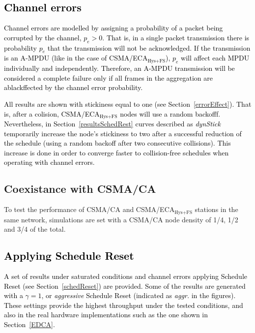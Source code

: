 	\textcolor{black}{\subsection{Channel errors}\label{channelErrorsDef}
	Channel errors are modelled by assigning a probability of a packet being corrupted by the channel, $p_e>0$. That is, in a single packet transmission there is probability $p_e$ that the transmission will not be acknowledged. If the transmission is an A-MPDU (like in the case of CSMA/ECA$_{\text{Hys+FS}}$), $p_e$ will affect each MPDU individually and independently. Therefore, an A-MPDU transmission will be considered a complete failure only if all frames in the aggregation are a{black}ffected by the channel error probability.}
	
	\textcolor{black}{All results are shown with stickiness equal to one (see Section~\ref{errorEffect}). That is, after a colision, CSMA/ECA$_{\text{Hys+FS}}$ nodes will use a random backofff. Nevertheless, in Section~\ref{resultsSchedRest} curves described as \emph{dynStick} temporarily increase the node's stickiness to two after a successful reduction of the schedule (using a random backoff after two consecutive collisions). This increase is done in order to converge faster to collision-free schedules when operating with channel errors.}
	
	\subsection{Coexistance with CSMA/CA}\label{coexistence}
	To test the performance of CSMA/CA and CSMA/ECA$_{\text{Hys+FS}}$ stations in the same network, simulations are set with a CSMA/CA node density of 1/4, 1/2 and 3/4 of the total.
	
	\textcolor{black}{\subsection{Applying Schedule Reset} 
	A set of results under saturated conditions and channel errors applying Schedule Reset (see Section~\ref{schedReset}) are provided. Some of the results are generated with a $\gamma=1$, or \emph{aggressive} Schedule Reset (indicated as \emph{aggr.} in the figures). These settings provide the highest throughput under the tested conditions, and also in the real hardware implementations such as the one shown in Section~\ref{EDCA}.
	}
